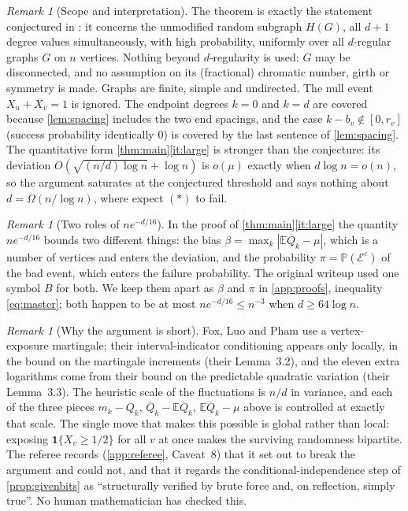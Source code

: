 \documentclass[11pt,a4paper]{article}
\theoremstyle{plain}
\theoremstyle{definition}
\theoremstyle{remark}
\newtheorem{remark}[theorem]{Remark}
\newcommand{\EE}{\mathbb E}
\newcommand{\PP}{\mathbb P}
\newcommand{\ind}{\mathbf 1}
\newcommand{\cE}{\mathcal E}
\newcommand{\Qbar}{\overline Q}
\begin{document}
\begin{remark}[Scope and interpretation]
The theorem is exactly the statement conjectured in \cite{FLP24}: it concerns the unmodified random subgraph $H(G)$, all $d+1$ degree values simultaneously, with high probability, uniformly over all $d$-regular graphs $G$ on $n$ vertices. Nothing beyond $d$-regularity is used: $G$ may be disconnected, and no assumption on its (fractional) chromatic number, girth or symmetry is made. Graphs are finite, simple and undirected. The null event $X_u+X_v=1$ is ignored. The endpoint degrees $k=0$ and $k=d$ are covered because \cref{lem:spacing} includes the two end spacings, and the case $k-b_v\notin[0,r_v]$ (success probability identically $0$) is covered by the last sentence of \cref{lem:spacing}. The quantitative form \cref{thm:main}\ref{it:large} is stronger than the conjecture: its deviation $O(\sqrt{(n/d)\log n}+\log n)$ is $o(\mu)$ exactly when $d\log n=o(n)$, so the argument saturates at the conjectured threshold and says nothing about $d=\Omega(n/\log n)$, where \cite{FLP24} expect $(\ast)$ to fail.
\end{remark}

\begin{remark}[Two roles of $ne^{-d/16}$]\label{rem:pun}
In the proof of \cref{thm:main}\ref{it:large} the quantity $ne^{-d/16}$ bounds two different things: the bias $\beta=\max_k|\EE\Qbar_k-\mu|$, which is a number of vertices and enters the deviation, and the probability $\pi=\PP(\cE^c)$ of the bad event, which enters the failure probability. The original writeup used one symbol $B$ for both. We keep them apart as $\beta$ and $\pi$ in \cref{app:proofs}, inequality \eqref{eq:master}; both happen to be at most $ne^{-d/16}\le n^{-3}$ when $d\ge64\log n$.
\end{remark}

\begin{remark}[Why the argument is short]
Fox, Luo and Pham \cite{FLP24} use a vertex-exposure martingale; their interval-indicator conditioning appears only locally, in the bound on the martingale increments (their Lemma~3.2), and the eleven extra logarithms come from their bound on the predictable quadratic variation (their Lemma~3.3). The heuristic scale of the fluctuations is $n/d$ in variance, and each of the three pieces $m_k-Q_k$, $\Qbar_k-\EE\Qbar_k$, $\EE\Qbar_k-\mu$ above is controlled at exactly that scale. The single move that makes this possible is global rather than local: exposing $\ind\{X_v\ge1/2\}$ for all $v$ at once makes the surviving randomness bipartite. The referee records (\cref{app:referee}, Caveat~8) that it set out to break the argument and could not, and that it regards the conditional-independence step of \cref{prop:givenbits} as ``structurally verified by brute force and, on reflection, simply true''. No human mathematician has checked this.
\end{remark}
\end{document}
